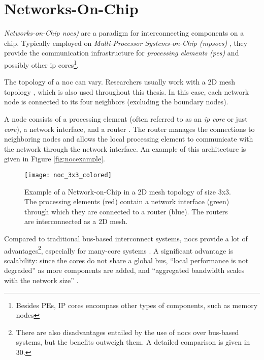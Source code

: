 
\section{Networks-On-Chip}\label{sec:networkonchipfun}
\textit{Networks-on-Chip \glspl{noc})} are a paradigm for interconnecting components on a chip. Typically employed on
\textit{Multi-Processor Systems-on-Chip (\glspl{mpsoc})} \cites(e.g.)(){ivanov05nocintroduction}{biswas15routerattack}{tatas16designingnocs}, they
provide the communication infrastructure for \textit{processing elements (\glspl{pe})} and possibly other \gls{ip} cores\footnote{Besides PEs, IP
cores encompass other types of components, such as memory nodes}.

The topology of a \gls{noc} can vary. Researchers usually work with a 2D mesh topology
\cites(e.g.)(){frey17hardenednoc}{kumar02networkonchip}{fernandes16nocrouting}{boraten16packetsecurity}, which is also used throughout this thesis.
In this case, each network node is connected to its four neighbors (excluding the boundary nodes).

A node consists of a processing element (often referred to as an \textit{\gls{ip} core} or just \textit{core}), a network interface,
and a router \cite{dally01routepacketsnotwires}. The router manages the connections to neighboring nodes and allows
the local processing element to communicate with the network through the network interface. An example of this architecture is given in Figure
\vref{fig:nocexample}.

\begin{figure}
    \centering
    \texttt{[image: noc\_3x3\_colored]}
    \caption[Example of a 3x3 mesh NoC]{Example of a Network-on-Chip in a 2D mesh topology of size 3x3. The processing elements (red) contain a network interface
    (green) through which they are connected to a router (blue). The routers are interconnected as a 2D mesh.}
    \label{fig:nocexample}
\end{figure}

Compared to traditional bus-based interconnect systems, \glspl{noc} provide a lot of advantages\footnote{There are also disadvantages entailed by
the use of \glspl{noc} over bus-based systems, but the benefits outweigh them. A detailed comparison is given in 30.}, especially for many-core systems
\cite[5\psqq]{tatas16designingnocs}. A significant advantage is scalability: since the cores do not share a global bus, \enquote{local performance is not
degraded} \cite[6]{tatas16designingnocs} as more components are added, and \enquote{aggregated bandwidth scales with the network size}
\cite[6]{tatas16designingnocs}.

